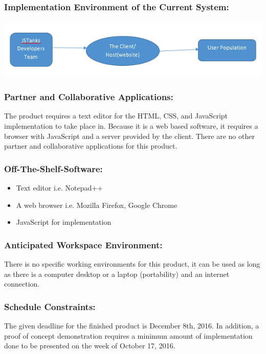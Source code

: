 \documentclass{article}
\begin{document}
\subsubsection{Implementation Environment of the Current System:}
\includegraphics[width=\textwidth]{Fig1.png}


\subsubsection{Partner and Collaborative Applications:} 
The product requires a
text editor for the HTML, CSS, and JavaScript implementation to take place in.
Because it is a web based software, it requires a browser with JavaScript and a
server provided by the client. There are no other partner and collaborative
applications for this product.


\subsubsection {Off-The-Shelf-Software:}
\begin{itemize}
\item Text editor i.e. Notepad++
\item A web browser i.e. Mozilla Firefox, Google Chrome
\item JavaScript for implementation
\end{itemize}

\subsubsection{Anticipated Workspace Environment:} 
There is no specific working
environments for this product, it can be used as long as there is a computer
desktop or a laptop (portability) and an internet connection.

\subsubsection{Schedule Constraints:} 
The given deadline for the finished
product is December 8th, 2016. In addition, a proof of concept demonstration
requires a minimum amount of implementation done to be presented on the week of
October 17, 2016.
\end{document}
